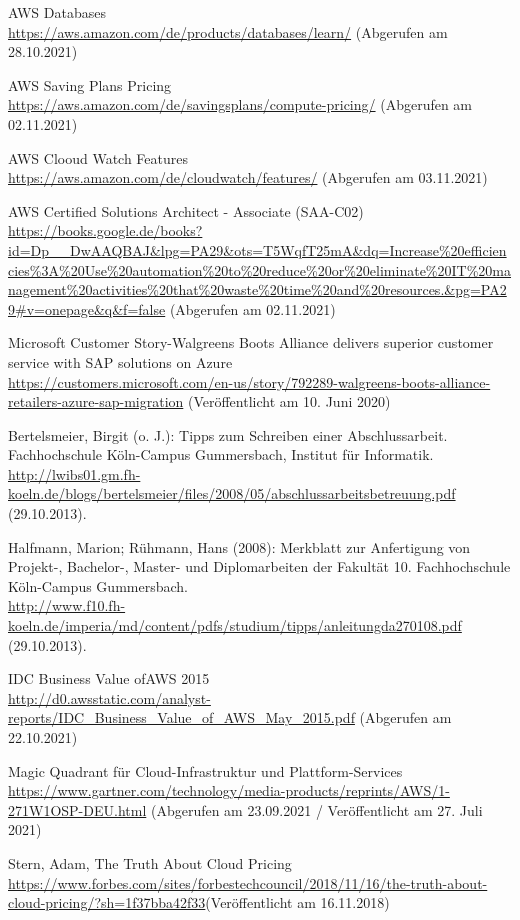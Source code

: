 \begin{thebibliography}{HR08}
   AWS Databases\\
  \url{https://aws.amazon.com/de/products/databases/learn/}
  (Abgerufen am 28.10.2021)

   AWS Saving Plans Pricing\\
  \url{https://aws.amazon.com/de/savingsplans/compute-pricing/}
  (Abgerufen am 02.11.2021)

   AWS Clooud Watch Features\\
  \url{https://aws.amazon.com/de/cloudwatch/features/}
  (Abgerufen am 03.11.2021)

 AWS Certified Solutions Architect - Associate (SAA-C02)\\
  \url{https://books.google.de/books?id=Dp__DwAAQBAJ&lpg=PA29&ots=T5WqfT25mA&dq=Increase%20efficiencies%3A%20Use%20automation%20to%20reduce%20or%20eliminate%20IT%20management%20activities%20that%20waste%20time%20and%20resources.&pg=PA29#v=onepage&q&f=false}
  (Abgerufen am 02.11.2021)
  
   Microsoft Customer Story-Walgreens Boots Alliance delivers superior customer service with SAP solutions on Azure \\
  \url{https://customers.microsoft.com/en-us/story/792289-walgreens-boots-alliance-retailers-azure-sap-migration}
  (Veröffentlicht am 10. Juni 2020)

  Bertelsmeier, Birgit (o. J.): Tipps zum Schrei\-b\-en ei\-n\-er Ab\-sch\-luss\-ar\-beit. Fach\-hoch\-schu\-le Köln-Campus Gummersbach, Institut für Informatik. \\
  \url{http://lwibs01.gm.fh-koeln.de/blogs/bertelsmeier/files/2008/05/abschlussarbeitsbetreuung.pdf} (29.10.2013).

   Halfmann, Marion; Rühmann, Hans (2008): Merkblatt zur Anfertigung von Projekt-, Bachelor-, Master- und Diplomarbeiten der Fakultät 10. Fachhochschule Köln-Campus Gummersbach. \\
  \url{http://www.f10.fh-koeln.de/imperia/md/content/pdfs/studium/tipps/anleitungda270108.pdf} (29.10.2013).

   IDC Business Value ofAWS 2015\\
 \url{http://d0.awsstatic.com/analyst-reports/IDC_Business_Value_of_AWS_May_2015.pdf}
 (Abgerufen am 22.10.2021)

  Magic Quadrant für Cloud-Infrastruktur und Plattform-Services \\
  \url{https://www.gartner.com/technology/media-products/reprints/AWS/1-271W1OSP-DEU.html}
  (Abgerufen am 23.09.2021 / Veröffentlicht am 27. Juli 2021)


  Stern, Adam, The Truth About Cloud Pricing \\
  \url{https://www.forbes.com/sites/forbestechcouncil/2018/11/16/the-truth-about-cloud-pricing/?sh=1f37bba42f33}(Veröffentlicht am 16.11.2018)

  

  
\end{thebibliography}

